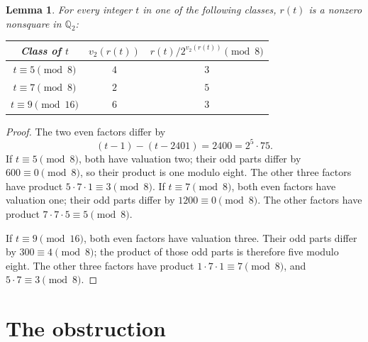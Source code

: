 \documentclass[11pt,a4paper]{article}
\newtheorem{lemma}[theorem]{Lemma}
\newcommand{\Q}{\mathbb Q}\newcommand{\Z}{\mathbb Z}
\begin{document}
\begin{lemma}\label{lem:residues}
For every integer $t$ in one of the following classes, $r(t)$
is a nonzero nonsquare in $\Q_2$:
\begin{center}
\begin{tabular}{ccc}
\toprule
Class of $t$ & $v_2(r(t))$ & $r(t)/2^{v_2(r(t))}\pmod8$\\
\midrule
$t\equiv5\pmod8$ & $4$ & $3$\\
$t\equiv7\pmod8$ & $2$ & $5$\\
$t\equiv9\pmod{16}$ & $6$ & $3$\\
\bottomrule
\end{tabular}
\end{center}
\end{lemma}
\begin{proof}
The two even factors differ by
\[
                  (t-1)-(t-2401)=2400=2^5\cdot75.
\]
If $t\equiv5\pmod8$, both have valuation two; their odd
parts differ by $600\equiv0\pmod8$, so their product is
one modulo eight. The other three factors have product
$5\cdot7\cdot1\equiv3\pmod8$.
If $t\equiv7\pmod8$, both even factors have valuation one;
their odd parts differ by $1200\equiv0\pmod8$.
The other factors have product $7\cdot7\cdot5\equiv5\pmod8$.

If $t\equiv9\pmod{16}$, both even factors have valuation three.
Their odd parts differ by $300\equiv4\pmod8$; the product
of those odd parts is therefore five modulo eight. The other
three factors have product $1\cdot7\cdot1\equiv7\pmod8$,
and $5\cdot7\equiv3\pmod8$.
\end{proof}

\section{The obstruction}
\end{document}
